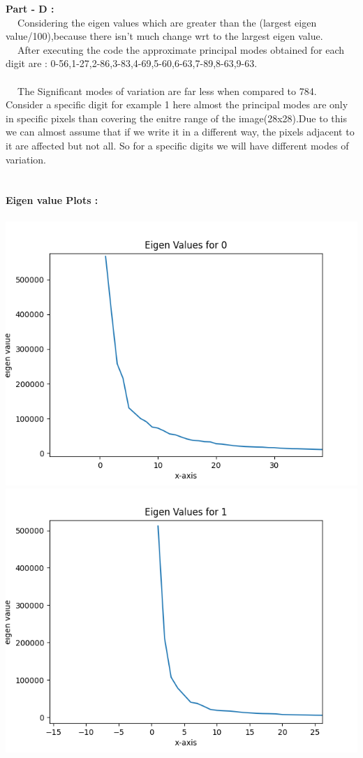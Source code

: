 \documentclass{article}
\begin{document}
    \textbf{Part - D :} \\
    $~~~~$ Considering the eigen values which are greater than the (largest eigen value/100),because there isn't much
    change wrt to the largest eigen value.
    \\
    $~~~~$ After executing the code the approximate principal modes obtained for each digit are :
    0-56,1-27,2-86,3-83,4-69,5-60,6-63,7-89,8-63,9-63.
    \\ \\
    $~~~~$ The Significant modes of variation are far less when compared to 784. \\
    Consider a specific digit for example 1 here almost the principal modes are only in specific pixels than 
    covering the enitre range of the image(28x28).Due to this we can almost assume that if we write it in a different way, the pixels
    adjacent to it are affected but not all. So for a specific digits we will have different modes of variation.
    \\ \\ \\
    \textbf{Eigen value Plots :} \\ \\
    \includegraphics[scale=.5]{../results/q4/eigen_plots/0_eigen_value.png}
    \includegraphics[scale=.5]{../results/q4/eigen_plots/1_eigen_value.png}
\end{document}
